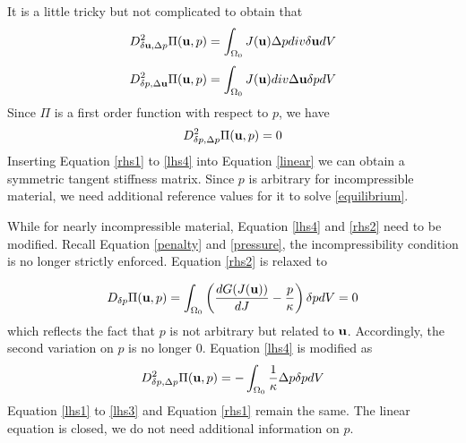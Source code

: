 It is a little tricky but not complicated to obtain that
\begin{equation} \label{lhs2}
D_{\delta\bold{u}, \Delta{p}}^2 \Pi(\bold{u}, p) = \int_{\Omega_0} J(\bold{u})\Delta{p}div\delta{\bold{u}}dV
\end{equation}
\begin{equation} \label{lhs3}
D_{\delta{p}, \Delta\bold{u}}^2 \Pi(\bold{u}, p) = \int_{\Omega_0} J(\bold{u})div\Delta{\bold{u}}\delta{p}dV
\end{equation}
Since $\Pi$ is a first order function with respect to $p$, we have
\begin{equation} \label{lhs4}
D_{\delta{p}, \Delta{p}}^2 \Pi(\bold{u}, p) = 0
\end{equation}
Inserting Equation \ref{rhs1} to \ref{lhs4} into Equation \ref{linear} we can obtain a symmetric tangent stiffness matrix. Since $p$ is arbitrary for incompressible material, we need additional reference values for it to solve \ref{equilibrium}.

While for nearly incompressible material, Equation \ref{lhs4} and \ref{rhs2} need to be modified. Recall Equation \ref{penalty} and \ref{pressure}, the incompressibility condition is no longer strictly enforced. Equation \ref{rhs2} is relaxed to

\begin{equation} \label{relation}
D_{\delta{p}}\Pi(\bold{u}, p) = \int_{\Omega_0}\left(  \frac{dG(J(\bold{u}))}{dJ} - \frac{p}{\kappa} \right)\delta{p}dV = 0
\end{equation}
which reflects the fact that $p$ is not arbitrary but related to $\bold{u}$.  
Accordingly, the second variation on $p$ is no longer $0$. Equation \ref{lhs4} is modified as
\begin{equation} \label{lhs42}
D_{\delta{p}, \Delta{p}}^2 \Pi(\bold{u}, p) = - \int_{\Omega_0}\frac{1}{\kappa}\Delta{p}\delta{p}dV
\end{equation}
Equation \ref{lhs1} to \ref{lhs3} and Equation \ref{rhs1} remain the same. The linear equation is closed, we do not need additional information on $p$.
